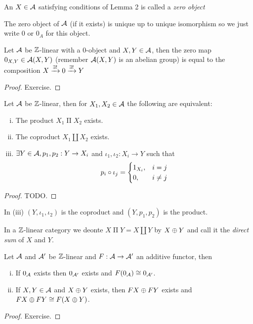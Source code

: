 \documentclass[a4paper]{report}
\begin{document}
\begin{defi}
  An $X \in \mathcal{A}$ satisfying conditions of Lemma 2 is called a \emph{zero object}
\end{defi}
\begin{nota*}
The zero object of $\mathcal{A}$ (if it exists) is unique up to unique isomorphism so we just write $0$ or $0_{A}$ for this object.
\end{nota*}

\begin{lemm}
  Let $\mathcal{A}$ be $\mathbb{Z}$-linear with a 0-object and $X, Y \in \mathcal{A}$, then the zero map $0_{X,Y} \in \mathcal{A}(X,Y)$ (remember $\mathcal{A}(X,Y)$ is an abelian group) is equal to the composition $X \xrightarrow{\exists !} 0\xrightarrow{\exists !} Y$
  \begin{proof}
Exercise.
  \end{proof}
\end{lemm}

\begin{prop}
  Let $\mathcal{A}$ be $\mathbb{Z}$-linear, then for $X_{1}, X_{2} \in \mathcal{A}$ the following are equivalent:
  \begin{enumerate}[(i)]
    \item The product $X_{1} \mathrel{\Pi} X_{2}$ exists.
    \item The coproduct $X_{1} \amalg X_{2}$ exists.
          \item $\exists Y \in \mathcal{A}, p_{1}, p_{2}: Y \to X_{i}$ and $\iota_{1}, \iota_{2}: X_{i} \to Y$ such that \[p_{i} \circ \iota_{j} = \begin{cases}
            1_{X_{i}}, & i = j \\
            0, & i \ne j
          \end{cases}\]
  \end{enumerate}
\end{prop}
\begin{proof}
TODO.
\end{proof}
\begin{rem*}
In (iii) $(Y,\iota_{1}, \iota_{2})$ is the coproduct and $(Y, p_{1}, p_{2})$ is the product.
\end{rem*}

\begin{defi}
In a $\mathbb{Z}$-linear category we deonte $X \mathrel \Pi Y = X \amalg Y$ by $X \oplus Y$ and call it the \emph{direct sum} of $X$ and $Y$.
\end{defi}

\begin{lemm}
  Let $\mathcal{A}$ and $\mathcal{A}'$ be $\mathbb{Z}$-linear and $F: \mathcal{A} \to \mathcal{A}'$ an additive functor, then
  \begin{enumerate}[(i)]
    \item If $0_{\mathcal{A}}$ exists then $0_{\mathcal{A}'}$ exists and $F(0_{\mathcal{A}}) \cong 0_{\mathcal{A}'}$.
          \item If $X, Y \in \mathcal{A}$ and $X \oplus Y$ exists, then $FX \oplus FY$ exists and $FX \oplus FY \cong F(X\oplus Y)$.
  \end{enumerate}
\begin{proof}
Exercise.
\end{proof}
\end{lemm}
\end{document}
